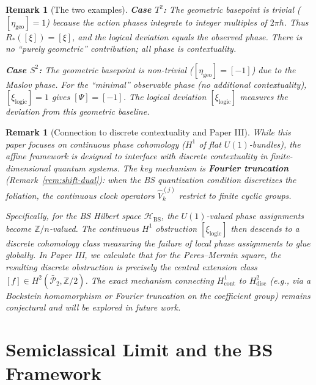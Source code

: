 \documentclass[11pt]{article}
\newtheorem{remark}[theorem]{Remark}
\begin{document}
\begin{remark}[The two examples]
\label{rem:two-examples}
\textbf{Case $T^2$:} The geometric basepoint is trivial
($[\eta_{\mathrm{geo}}] = 1$) because the action phases integrate to integer
multiples of $2\pi\hbar$. Thus $R_*([\xi]) = [\xi]$, and the logical
deviation equals the observed phase. There is no ``purely geometric''
contribution; all phase is contextuality.

\textbf{Case $S^2$:} The geometric basepoint is non-trivial
($[\eta_{\mathrm{geo}}] = [-1]$) due to the Maslov phase. For the
``minimal'' observable phase (no additional contextuality),
$[\xi_{\mathrm{logic}}] = 1$ gives $[\Psi] = [-1]$. The logical deviation
$[\xi_{\mathrm{logic}}]$ measures the deviation from this geometric baseline.
\end{remark}

\begin{remark}[Connection to discrete contextuality and Paper III]
\label{rem:connection-paper3}
While this paper focuses on continuous phase cohomology ($H^1$ of flat $U(1)$-bundles), the affine framework is designed to interface with discrete contextuality in finite-dimensional quantum systems. The key mechanism is \textbf{Fourier truncation} (Remark~\ref{rem:shift-dual}): when the BS quantization condition discretizes the foliation, the continuous clock operators $\hat{V}_k^{(j)}$ restrict to finite cyclic groups.

Specifically, for the BS Hilbert space $\mathcal{H}_{\mathrm{BS}}$, the $U(1)$-valued phase assignments become $\mathbb{Z}/n$-valued. The continuous $H^1$ obstruction $[\xi_{\mathrm{logic}}]$ then descends to a discrete cohomology class measuring the failure of local phase assignments to glue globally. In Paper III, we calculate that for the Peres--Mermin square, the resulting discrete obstruction is precisely the central extension class $[f] \in H^2(\bar{\mathcal{P}}_2, \mathbb{Z}/2)$. The exact mechanism connecting $H^1_{\mathrm{cont}}$ to $H^2_{\mathrm{disc}}$ (e.g., via a Bockstein homomorphism or Fourier truncation on the coefficient group) remains conjectural and will be explored in future work.
\end{remark}


\section{Semiclassical Limit and the BS Framework}
\label{sec:semiclassical}
\end{document}
